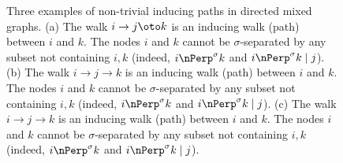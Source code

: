 \begin{figure}\centering
  \caption{Three examples of non-trivial inducing paths in directed mixed graphs. (a) The walk $i \to j \oto k$ is an inducing walk (path) between $i$ and $k$. The nodes $i$ and $k$ cannot be $\sigma$-separated by any subset not containing $i,k$ (indeed, $i \nPerp^\sigma k$ and $i \nPerp^\sigma k \mid j$). (b) The walk $i \to j \to k$ is an inducing walk (path) between $i$ and $k$. The nodes $i$ and $k$ cannot be $\sigma$-separated by any subset not containing $i,k$ (indeed, $i \nPerp^\sigma k$ and $i \nPerp^\sigma k \mid j$). (c) The walk $i \to j \to k$ is an inducing walk (path) between $i$ and $k$. The nodes $i$ and $k$ cannot be $\sigma$-separated by any subset not containing $i,k$ (indeed, $i \nPerp^\sigma k$ and $i \nPerp^\sigma k \mid j$).\label{fig:inducing_path}}
\end{figure}

